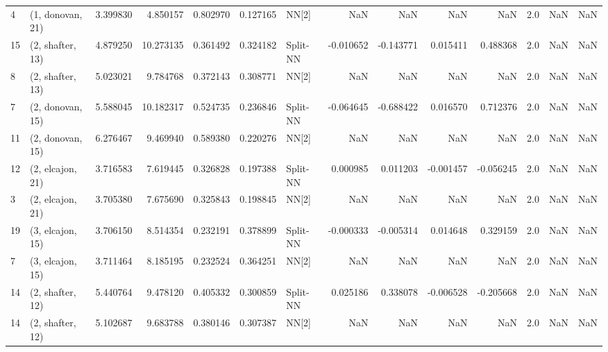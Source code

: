 \begin{tabular}{llrrrrlrrrrrrl}
4  &  (1, donovan, 21) &  3.399830 &   4.850157 &   0.802970 &  0.127165 &       NN[2] &             NaN &           NaN &            NaN &          NaN &            2.0 &    NaN &              NaN \\
15 &  (2, shafter, 13) &  4.879250 &  10.273135 &   0.361492 &  0.324182 &    Split-NN &       -0.010652 &     -0.143771 &       0.015411 &     0.488368 &            2.0 &    NaN &              NaN \\
8  &  (2, shafter, 13) &  5.023021 &   9.784768 &   0.372143 &  0.308771 &       NN[2] &             NaN &           NaN &            NaN &          NaN &            2.0 &    NaN &              NaN \\
7  &  (2, donovan, 15) &  5.588045 &  10.182317 &   0.524735 &  0.236846 &    Split-NN &       -0.064645 &     -0.688422 &       0.016570 &     0.712376 &            2.0 &    NaN &              NaN \\
11 &  (2, donovan, 15) &  6.276467 &   9.469940 &   0.589380 &  0.220276 &       NN[2] &             NaN &           NaN &            NaN &          NaN &            2.0 &    NaN &              NaN \\
12 &  (2, elcajon, 21) &  3.716583 &   7.619445 &   0.326828 &  0.197388 &    Split-NN &        0.000985 &      0.011203 &      -0.001457 &    -0.056245 &            2.0 &    NaN &              NaN \\
3  &  (2, elcajon, 21) &  3.705380 &   7.675690 &   0.325843 &  0.198845 &       NN[2] &             NaN &           NaN &            NaN &          NaN &            2.0 &    NaN &              NaN \\
19 &  (3, elcajon, 15) &  3.706150 &   8.514354 &   0.232191 &  0.378899 &    Split-NN &       -0.000333 &     -0.005314 &       0.014648 &     0.329159 &            2.0 &    NaN &              NaN \\
7  &  (3, elcajon, 15) &  3.711464 &   8.185195 &   0.232524 &  0.364251 &       NN[2] &             NaN &           NaN &            NaN &          NaN &            2.0 &    NaN &              NaN \\
14 &  (2, shafter, 12) &  5.440764 &   9.478120 &   0.405332 &  0.300859 &    Split-NN &        0.025186 &      0.338078 &      -0.006528 &    -0.205668 &            2.0 &    NaN &              NaN \\
14 &  (2, shafter, 12) &  5.102687 &   9.683788 &   0.380146 &  0.307387 &       NN[2] &             NaN &           NaN &            NaN &          NaN &            2.0 &    NaN &              NaN \\

\end{tabular}
